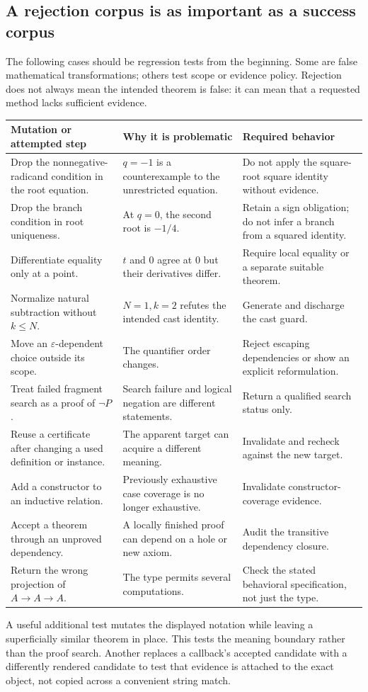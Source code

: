 \documentclass[11pt,a4paper]{article}
\theoremstyle{remark}
\begin{document}
\subsection{A rejection corpus is as important as a success corpus}
The following cases should be regression tests from the beginning. Some are false mathematical transformations; others test scope or evidence policy. Rejection does not always mean the intended theorem is false: it can mean that a requested method lacks sufficient evidence.
\begin{longtable}{@{}L{.30\linewidth}L{.31\linewidth}L{.33\linewidth}@{}}
\toprule
Mutation or attempted step & Why it is problematic & Required behavior\\
\midrule
\endhead
Drop the nonnegative-radicand condition in the root equation. & $q=-1$ is a counterexample to the unrestricted equation. & Do not apply the square-root square identity without evidence.\\[4pt]
Drop the branch condition in root uniqueness. & At $q=0$, the second root is $-1/4$. & Retain a sign obligation; do not infer a branch from a squared identity.\\[4pt]
Differentiate equality only at a point. & $t$ and $0$ agree at $0$ but their derivatives differ. & Require local equality or a separate suitable theorem.\\[4pt]
Normalize natural subtraction without $k\leq N$. & $N=1,k=2$ refutes the intended cast identity. & Generate and discharge the cast guard.\\[4pt]
Move an $\varepsilon$-dependent choice outside its scope. & The quantifier order changes. & Reject escaping dependencies or show an explicit reformulation.\\[4pt]
Treat failed fragment search as a proof of $\neg P$. & Search failure and logical negation are different statements. & Return a qualified search status only.\\[4pt]
Reuse a certificate after changing a used definition or instance. & The apparent target can acquire a different meaning. & Invalidate and recheck against the new target.\\[4pt]
Add a constructor to an inductive relation. & Previously exhaustive case coverage is no longer exhaustive. & Invalidate constructor-coverage evidence.\\[4pt]
Accept a theorem through an unproved dependency. & A locally finished proof can depend on a hole or new axiom. & Audit the transitive dependency closure.\\[4pt]
Return the wrong projection of $A\to A\to A$. & The type permits several computations. & Check the stated behavioral specification, not just the type.\\
\bottomrule
\end{longtable}
A useful additional test mutates the displayed notation while leaving a superficially similar theorem in place. This tests the meaning boundary rather than the proof search. Another replaces a callback's accepted candidate with a differently rendered candidate to test that evidence is attached to the exact object, not copied across a convenient string match.
\end{document}
